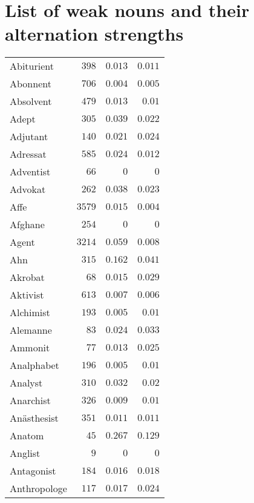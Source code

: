 \twocolumn

\chapter{List of weak nouns and their alternation strengths}
\label{sec:listofweaknounsandtheiralternationstrengts}

\footnotesize

\tabletail{\bottomrule}

\begin{supertabular}{lrrr}
Abiturient & $398$ & $0.013$ & $0.011$ \\
Abonnent & $706$ & $0.004$ & $0.005$ \\
Absolvent & $479$ & $0.013$ & $0.01$ \\
Adept & $305$ & $0.039$ & $0.022$ \\
Adjutant & $140$ & $0.021$ & $0.024$ \\
Adressat & $585$ & $0.024$ & $0.012$ \\
Adventist & $66$ & $0$ & $0$ \\
Advokat & $262$ & $0.038$ & $0.023$ \\
Affe & $3579$ & $0.015$ & $0.004$ \\
Afghane & $254$ & $0$ & $0$ \\
Agent & $3214$ & $0.059$ & $0.008$ \\
Ahn & $315$ & $0.162$ & $0.041$ \\
Akrobat & $68$ & $0.015$ & $0.029$ \\
Aktivist & $613$ & $0.007$ & $0.006$ \\
Alchimist & $193$ & $0.005$ & $0.01$ \\
Alemanne & $83$ & $0.024$ & $0.033$ \\
Ammonit & $77$ & $0.013$ & $0.025$ \\
Analphabet & $196$ & $0.005$ & $0.01$ \\
Analyst & $310$ & $0.032$ & $0.02$ \\
Anarchist & $326$ & $0.009$ & $0.01$ \\
Anästhesist & $351$ & $0.011$ & $0.011$ \\
Anatom & $45$ & $0.267$ & $0.129$ \\
Anglist & $9$ & $0$ & $0$ \\
Antagonist & $184$ & $0.016$ & $0.018$ \\
Anthropologe & $117$ & $0.017$ & $0.024$ \\

\end{supertabular}
